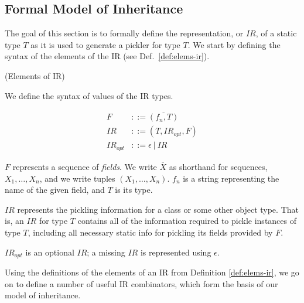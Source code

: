 \documentclass[preprint,10pt]{sigplanconf}
\theoremstyle{definition}
\theoremstyle{definition}
\begin{document}
\subsection{Formal Model of Inheritance}
\label{sec:ir}

The goal of this section is to formally define the representation, or
$IR$, of a static type $T$ as it is used to generate a pickler for
type $T$. We start by defining the syntax of the elements of the IR
(see Def.~\ref{def:elems-ir}).

\begin{defn}{(Elements of IR)}
\label{def:elems-ir}

We define the syntax of values of the IR types.

\begin{align*}
F&        ::= \overline{(f_n, T)}\\
IR&       ::= (T, IR_{opt}, F)\\
IR_{opt}& ::= \epsilon~|~IR
\end{align*}

$F$ represents a sequence of \textit{fields}. We write $\overline{X}$ as
shorthand for sequences, $X_1,\dots,X_n$, and we write tuples
$(X_1,\dots,X_n)$. $f_n$ is a string representing the name of the given field,
and $T$ is its type.

$IR$ represents the pickling information for a class or some other object
type. That is, an $IR$ for type $T$ contains all of the information required
to pickle instances of type $T$, including all necessary static info for
pickling its fields provided by $F$.

$IR_{opt}$ is an optional $IR$; a missing $IR$ is represented using $\epsilon$.
\end{defn}

Using the definitions of the elements of an IR from Definition \ref{def:elems-ir},
we go on to define a number of useful IR combinators, which form the
basis of our model of inheritance.



\end{document}
